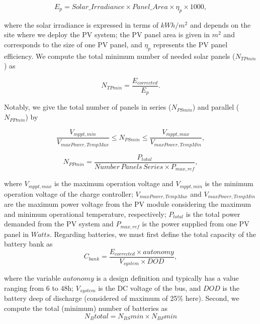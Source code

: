 \documentclass[journal]{IEEEtran}
\begin{document}
\begin{equation}
\label{eq:Ep}
E_{p} = Solar\_Irradiance \times Panel\_Area \times \eta_{p} \times 1000,
\end{equation}

\noindent where the solar irradiance is expressed in terms of $kWh/m^{2}$ and depends on the site where we deploy the PV system; 
the PV panel area is given in $m^{2}$ and corresponds to the size of one PV panel, and $\eta_{p}$ represents the PV panel efficiency.
We compute the total minimum number of needed solar panels ($N_{TPmin}$) as

\begin{equation}
\label{eq:NTPmin}
N_{TPmin} = \dfrac{E_{corrected}}{E_{p}}.
\end{equation}

Notably, we give the total number of panels in series ($N_{PSmin}$) and parallel ($N_{PPmin}$) by

\begin{equation}
\label{eq:NPSmin}
\dfrac{V_{mppt,min}}{V_{maxPower,TempMax}} \leq N_{PSmin} \leq \dfrac{V_{mppt,max}}{V_{maxPower,TempMin}},
\end{equation}

\begin{equation}
\label{eq:NPPmin}
N_{PPmin} = \dfrac{P_{total}}{Number\,Panels\,Series \times P_{max,ref}},
\end{equation}

\noindent where $V_{mppt,max}$ is the maximum operation voltage and $V_{mppt,min}$ 
is the minimum operation voltage of the charge controller; $V_{maxPower,TempMax}$ and 
$V_{maxPower,TempMin}$ are the maximum power voltage from the PV module considering 
the maximum and minimum operational temperature, respectively; 
$P_{total}$ is the total power demanded from the PV system and 
$P_{max,ref}$ is the power supplied from one PV panel in $Watts$.
Regarding batteries, we must first define the total capacity of the battery bank as
%
\begin{equation}
\label{eq:Cbank}
C_{bank} = \dfrac{E_{corrected} \times autonomy}{V_{system} \times DOD},
\end{equation}

\noindent where the variable $autonomy$ is a design definition and typically has a value ranging from $6$ to $48$h; $ V_{system} $ 
is the DC voltage of the bus, and $ DOD $ is the battery deep of discharge (considered of maximum of 25\% here).
%
Second, we compute the total (minimum) number of batteries as 
%
\begin{equation}
\label{eq:Nbtotal}
N_{B}total = N_{BS}min \times N_{BP}min
\end{equation}
\end{document}
